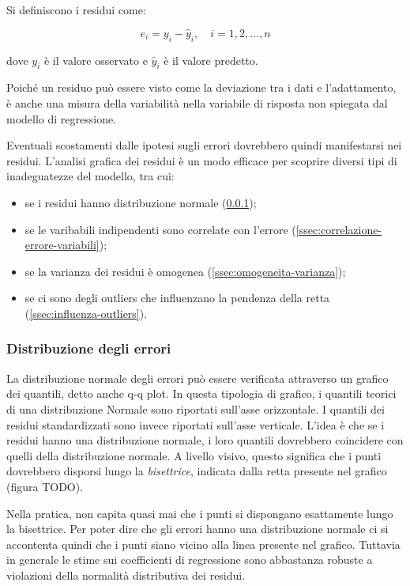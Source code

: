 Si definiscono i residui come:

$$e_{i}=y_{i}-\hat{y}_{i}, \quad i=1,2, \ldots, n$$\smallskip

dove $y_{i}$ è il valore osservato e $\hat{y}_{i}$ è il valore predetto.

Poiché un residuo può essere visto come la deviazione tra i dati e l'adattamento, è anche una misura della variabilità nella variabile di risposta non spiegata dal modello di regressione. \cite{introduction_to_lr}

Eventuali scostamenti dalle ipotesi sugli errori dovrebbero quindi manifestarsi nei residui. L'analisi grafica dei residui è un modo efficace per scoprire diversi tipi di inadeguatezze del modello, tra cui: 
\begin{itemize}
  \item se i residui hanno distribuzione normale (\ref{ssec:distr-errori});
  \item se le varibabili indipendenti sono correlate con l'errore (\ref{ssec:correlazione-errore-variabili});
  \item se la varianza dei residui è omogenea (\ref{ssec:omogeneita-varianza});
  \item se ci sono degli outliers che influenzano la pendenza della retta (\ref{ssec:influenza-outliers}).
\end{itemize}

\subsubsection{Distribuzione degli errori}\label{ssec:distr-errori}
La distribuzione normale degli errori può essere verificata attraverso un grafico dei quantili, detto anche q-q plot.
In questa tipologia di grafico, i quantili teorici di una distribuzione Normale sono riportati sull’asse orizzontale. I quantili dei residui standardizzati sono invece riportati sull’asse verticale.
L’idea è che se i residui hanno una distribuzione normale, i loro quantili dovrebbero coincidere con quelli della distribuzione normale. A livello visivo, questo significa che i punti dovrebbero disporsi lungo la \textit{bisettrice}, indicata dalla retta presente nel grafico (figura TODO).


Nella pratica, non capita quasi mai che i punti si dispongano esattamente lungo la bisettrice. Per poter dire che gli errori hanno una distribuzione normale ci si accontenta quindi che i punti siano vicino alla linea presente nel grafico.
Tuttavia in generale le stime sui coefficienti di regressione sono abbastanza robuste a violazioni della normalità distributiva dei residui.

